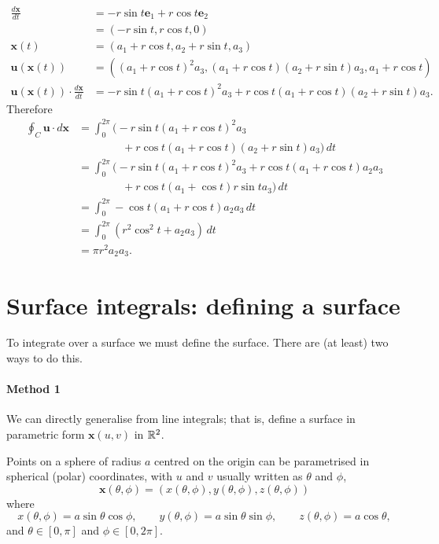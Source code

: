 \begin{solution}
    \begin{align*}
        \frac{d\bm x}{dt} 
        &= -r\sin t\bm e_1 + r\cos t \bm e_2 \\
        &= (-r\sin t, r\cos t, 0) \\
        \bm x(t) 
        &= (a_1 + r\cos t, a_2 + r\sin t, a_3) \\
        \bm u(\bm x(t))
        &= ((a_1 + r\cos t)^2a_3, (a_1 + r\cos t)(a_2 + r\sin t)a_3,
        a_1 + r\cos t) \\
        \bm u(\bm x(t)) \cdot \frac{d\bm x}{dt}
        &= -r\sin t(a_1 + r\cos t)^2a_3 + 
        r\cos t(a_1 + r\cos t)(a_2 + r\sin t)a_3.
    \end{align*}
    Therefore
    \begin{align*}
        \oint_C \bm u \cdot d\bm x
        &= \int_0^{2\pi}
        \big(
            -r\sin t(a_1 + r\cos t)^2a_3
            \\& \qquad\qquad
            + r\cos t(a_1 + r\cos t)(a_2 + r\sin t)a_3
        \big)
        \, dt \\
        &= \int_0^{2\pi}
        \big(
            -r\sin t(a_1 + r\cos t)^2 a_3
            +r\cos t(a_1 + r\cos t)a_2a_3
            \\& \qquad\qquad
            +r\cos t(a_1 + \cos t)r\sin t a_3
        \big)
        \, dt \\
        &= \int_0^{2\pi} -\cos t (a_1 + r\cos t) a_2 a_3 \, dt \\
        &= \int_0^{2\pi} \left( r^2\cos^2{t} + a_2 a_3 \right) \, dt \\
        &= \pi r^2 a_2 a_3.
    \end{align*}
\end{solution}

\section{Surface integrals: defining a surface}

To integrate over a surface we must define the surface.
There are (at least) two ways to do this.

\paragraph{Method 1} 
We can directly generalise from line integrals; that is,
define a surface in parametric form $\bm x(u, v)$ in $\mathbb{R}^2$.

\begin{example}
    Points on a sphere of radius $a$ centred on the origin can be
    parametrised in spherical (polar) coordinates,
    with $u$ and $v$ usually written as $\theta$ and $\phi$,
    \[
        \bm x(\theta, \phi) = (x(\theta, \phi), 
        y(\theta, \phi), 
        z(\theta, \phi))
    \]
    where
    \[
        x(\theta, \phi) = a\sin\theta\cos\phi, \qquad
        y(\theta, \phi) = a\sin\theta\sin\phi, \qquad
        z(\theta, \phi) = a\cos\theta,
    \]
    and $\theta \in [0, \pi]$ and $\phi \in [0, 2\pi]$.
\end{example}
